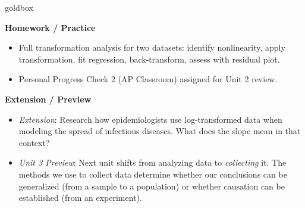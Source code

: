 \documentclass[10pt]{article}
\begin{document}
\begin{skillbox}{goldbox}
\begin{minipage}[t]{0.48\linewidth}
    \textbf{Homework / Practice}
    \begin{itemize}
        \item Full transformation analysis for two datasets: identify nonlinearity, apply transformation, fit regression, back-transform, assess with residual plot.
        \item Personal Progress Check 2 (AP Classroom) assigned for Unit 2 review.
    \end{itemize}
\end{minipage}
\hfill
\begin{minipage}[t]{0.48\linewidth}
    \textbf{Extension / Preview}
    \begin{itemize}
        \item \textit{Extension}: Research how epidemiologists use log-transformed data when modeling the spread of infectious diseases. What does the slope mean in that context?
        \item \textit{Unit 3 Preview}: Next unit shifts from analyzing data to \textit{collecting} it. The methods we use to collect data determine whether our conclusions can be generalized (from a sample to a population) or whether causation can be established (from an experiment).
    \end{itemize}
\end{minipage}
\end{skillbox}
\end{document}
